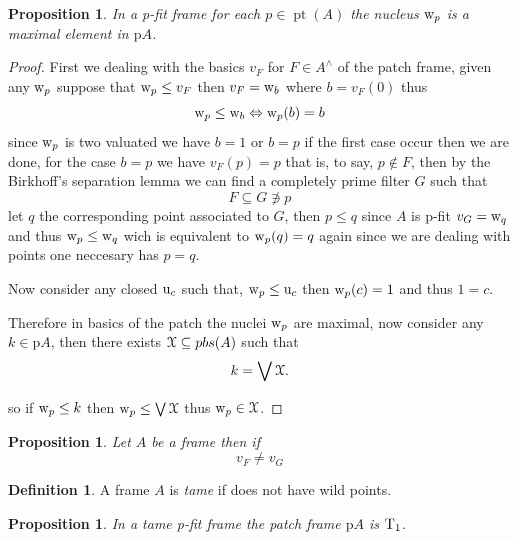 \documentclass[11pt]{amsart}
\DeclareMathOperator{\pt}{pt}
\newcommand{\niton}{\not\owns}
\theoremstyle{plain}
\newtheorem{prop}[thm]{Proposition}
\theoremstyle{definition}
\newtheorem{dfn}[thm]{Definition}
\begin{document}
\begin{prop}\label{fitpro}
In a {\rm p-fit} frame for each $p\in\pt(A)$ the nucleus ${\rm w}_{p}$ is a maximal element in $\mathrm{p}A$.
\end{prop}



\begin{proof}\label{maxp}
First we dealing with the basics $v_{F}$ for $F\in A^{\wedge}$ of the patch frame, given any ${\rm w}_{p}$ suppose that  
${\rm w}_{p} \leq v_{F}$ then $v_{F}={\rm w}_{b}$ where $b=v_{F}(0)$ thus \[{\rm w}_{p}\leq {\rm w}_{b}\Leftrightarrow {\rm w}_{p}(b)=b\]
 since ${\rm w}_{p}$ is two valuated we have $b=1$ or $b=p$  if the first case occur then we are done, for the case $b=p$ we have $v_{F}(p)=p$ that is, to say, $p\notin F$,
 then by the Birkhoff's separation lemma we can find a completely prime filter $G$ such that \[F\subseteq G\niton p\] let $q$ the corresponding point associated to $G$, then $p\leq q$ since $A$ is 
 {\rm p-fit} $v_{G}={\rm w}_{q}$ and thus ${\rm w}_{p}\leq {\rm w}_{q}$ wich is equivalent to ${\rm w}_{p}(q)=q$ again since we are dealing with points one neccesary has $p=q$.

 Now consider any closed ${\rm u}_{c}$ such that, ${\rm w}_{p}\leq {\rm u}_{c}$ then ${\rm w}_{p}(c)=1$ and thus $1=c$.

 Therefore in basics of the patch the nuclei ${\rm w}_{p}$ are maximal, now consider any $k\in\mathrm{p}A$, then there exists $\EuScript{X}\subseteq pbs(A)$ such that \[k=\bigvee\EuScript{X}.\]

so if ${\rm w}_{p}\leq k$ then ${\rm w}_{p}\leq \bigvee\EuScript{X}$ 
thus ${\rm w}_{p}\in \EuScript{X}$.




\end{proof}


\begin{prop}\label{kcf}
Let $A$ be a frame then if \[v_{F}\neq v_{G}\]
\end{prop}




\begin{dfn}\label{tame}
A frame $A$ is \emph{tame} if does not have wild points.
\end{dfn}


\begin{prop}\label{fitpro1}
	In a tame {\rm p-fit} frame the patch frame  $\mathrm{p}A$ is ${\rm T}_{1}$.
	\end{prop}
\end{document}

